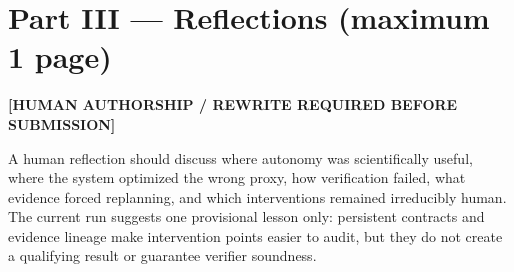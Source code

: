 \documentclass{article}
\begin{document}
\newpage
\section*{Part III --- Reflections (maximum 1 page)}
\begin{center}\textbf{[HUMAN AUTHORSHIP / REWRITE REQUIRED BEFORE SUBMISSION]}\end{center}
A human reflection should discuss where autonomy was scientifically useful, where the system optimized the wrong proxy, how verification failed, what evidence forced replanning, and which interventions remained irreducibly human. The current run suggests one provisional lesson only: persistent contracts and evidence lineage make intervention points easier to audit, but they do not create a qualifying result or guarantee verifier soundness.



\end{document}
